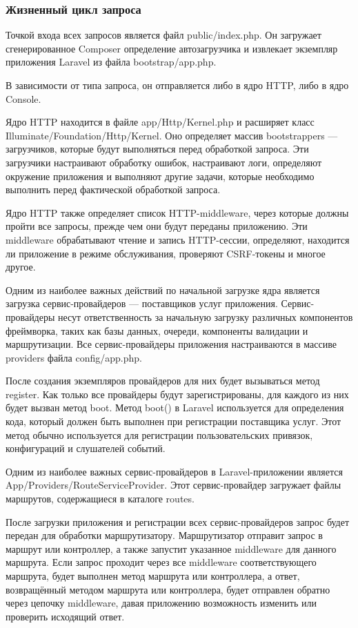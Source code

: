 \subsubsection{Жизненный цикл запроса}

Точкой входа всех запросов является файл public/index.php. Он загружает сгенерированное Composer определение автозагрузчика и извлекает экземпляр приложения Laravel из файла bootstrap/app.php.

В зависимости от типа запроса, он отправляется либо в ядро HTTP, либо в ядро Console.

Ядро HTTP находится в файле app/Http/Kernel.php и расширяет класс Illuminate/Foundation/Http/Kernel. Оно определяет массив bootstrappers — загрузчиков, которые будут выполняться перед обработкой запроса. Эти загрузчики настраивают обработку ошибок, настраивают логи, определяют окружение приложения и выполняют другие задачи, которые необходимо выполнить перед фактической обработкой запроса.

Ядро HTTP также определяет список HTTP-middleware, через которые должны пройти все запросы, прежде чем они будут переданы приложению. Эти middleware обрабатывают чтение и запись HTTP-сессии, определяют, находится ли приложение в режиме обслуживания, проверяют CSRF-токены и многое другое.

Одним из наиболее важных действий по начальной загрузке ядра является загрузка сервис-провайдеров — поставщиков услуг приложения. Сервис-провайдеры несут ответственность за начальную загрузку различных компонентов фреймворка, таких как базы данных, очереди, компоненты валидации и маршрутизации. Все сервис-провайдеры приложения настраиваются в массиве providers файла config/app.php.

После создания экземпляров провайдеров для них будет вызываться метод register. Как только все провайдеры будут зарегистрированы, для каждого из них будет вызван метод boot. Метод boot() в Laravel используется для определения кода, который должен быть выполнен при регистрации поставщика услуг. Этот метод обычно используется для регистрации пользовательских привязок, конфигураций и слушателей событий.

Одним из наиболее важных сервис-провайдеров в Laravel-приложении является App/Providers/RouteServiceProvider. Этот сервис-провайдер загружает файлы маршрутов, содержащиеся в каталоге routes.

После загрузки приложения и регистрации всех сервис-провайдеров запрос будет передан для обработки маршрутизатору. Маршрутизатор отправит запрос в маршрут или контроллер, а также запустит указанное middleware для данного маршрута. Если запрос проходит через все middleware соответствующего маршрута, будет выполнен метод маршрута или контроллера, а ответ, возвращённый методом маршрута или контроллера, будет отправлен обратно через цепочку middleware, давая приложению возможность изменить или проверить исходящий ответ.

